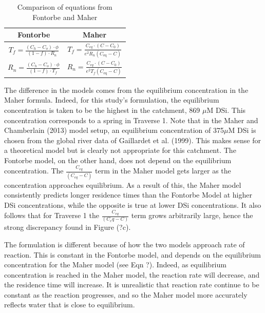 \begin{table}[h]
    \centering
    \renewcommand{\arraystretch}{2.2} %
    \begin{tabular}{cc}
        \toprule
        \textbf{Fontorbe} & \textbf{Maher} \\
        \midrule
        $\displaystyle T_f  = \frac{\left(C_h - C_o\right)\cdot\phi}{\left(1-f\right)\cdot R_n}$ & 
        $\displaystyle T_f = \frac{C_{eq} \cdot \left(C - C_0\right)}{e^2 R_n \left( C_{\text{eq}} - C \right)}$ \\ [10pt]
        $\displaystyle R_n  = \frac{\left(C_h - C_o\right)\cdot\phi}{\left(1-f\right)\cdot T_f}$ & 
        $\displaystyle R_n = \frac{C_{eq} \cdot \left(C - C_0\right)}{e^2 T_f \left( C_{\text{eq}} - C \right)}$ \\
        \bottomrule
    \end{tabular}
    \caption{Comparison of equations from Fontorbe and Maher}
    \label{tab:equations}
\end{table}

The difference in the models comes from the equilibrium concentration in the Maher formula. Indeed, for this study's formulation, the equilibrium concentration is taken to be the highest in the catchment, 869 $\mu$M DSi. This concentration corresponds to a spring in Traverse 1. Note that in the Maher and Chamberlain (2013) model setup, an equilibrium concentration of 375$\mu$M DSi is chosen from the global river data of Gaillardet et al. (1999). This makes sense for a theoretical model but is clearly not appropriate for this catchment. The Fontorbe model, on the other hand, does not depend on the equilibrium concentration. The $\frac{C_{eq}}{(C_{eq} - C)}$ term in the Maher model gets larger as the concentration approaches equilibrium. As a result of this, the Maher model consistently predicts longer residence times than the Fontorbe Model at higher DSi concentrations, while the opposite is true at lower DSi concentrations. It also follows that for Traverse 1 the $\frac{C_{eq}}{(C_eq - C)}$ term grows arbitrarily large, hence the strong discrepancy found in Figure (?c).

\bsk

The formulation is different because of how the two models approach rate of reaction. This is constant in the Fontorbe model, and depends on the equilibrium concentration for the Maher model (see Eqn ?). Indeed, as equilibrium concentration is reached in the Maher model, the reaction rate will decrease, and the residence time will increase. It is unrealistic that reaction rate continue to be constant as the reaction progresses, and so the Maher model more accurately reflects water that is close to equilibrium.

